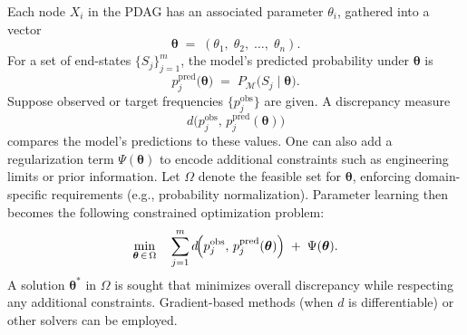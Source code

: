Each node \(X_i\) in the PDAG has an associated parameter \(\theta_i\), gathered into a vector  
\[
\boldsymbol{\theta}
\;=\;
(\theta_1,\;\theta_2,\;\dots,\;\theta_n).
\]
For a set of end-states \(\{S_j\}_{j=1}^m\), the model’s predicted probability under \(\boldsymbol{\theta}\) is  
\[
p_{j}^{\mathrm{pred}}\bigl(\boldsymbol{\theta}\bigr)
\;=\;
P_{\mathcal{M}}\bigl(S_j \mid \boldsymbol{\theta}\bigr).
\]
Suppose observed or target frequencies \(\bigl\{p_{j}^{\mathrm{obs}}\bigr\}\) are given. A discrepancy measure  
\[
d\!\bigl(p_{j}^{\mathrm{obs}},\,p_{j}^{\mathrm{pred}}(\boldsymbol{\theta})\bigr)
\]
compares the model’s predictions to these values. One can also add a regularization term \(\Psi(\boldsymbol{\theta})\) to encode additional constraints such as engineering limits or prior information. Let \(\Omega\) denote the feasible set for \(\boldsymbol{\theta}\), enforcing domain-specific requirements (e.g., probability normalization). Parameter learning then becomes the following constrained optimization problem:
\[
\min_{\boldsymbol{\theta} \,\in\, \Omega} 
\quad 
\sum_{j=1}^m
d\!\Bigl(
   p_{j}^{\mathrm{obs}},\,
   p_{j}^{\mathrm{pred}}(\boldsymbol{\theta})
\Bigr)
\;+\;
\Psi(\boldsymbol{\theta}).
\]
A solution \(\boldsymbol{\theta}^{*}\) in \(\Omega\) is sought that minimizes overall discrepancy while respecting any additional constraints. Gradient-based methods (when \(d\) is differentiable) or other solvers can be employed.




